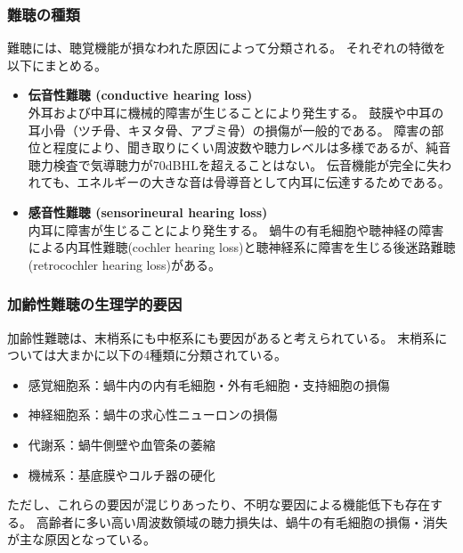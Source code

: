 \subsubsection{難聴の種類}
難聴には、聴覚機能が損なわれた原因によって分類される。
それぞれの特徴を以下にまとめる。

\begin{itemize}
\item \textbf{伝音性難聴 (conductive hearing loss)}\\
 外耳および中耳に機械的障害が生じることにより発生する。
 鼓膜や中耳の耳小骨（ツチ骨、キヌタ骨、アブミ骨）の損傷が一般的である。
 障害の部位と程度により、聞き取りにくい周波数や聴力レベルは多様であるが、純音聴力検査で気導聴力が70dBHLを超えることはない。
 伝音機能が完全に失われても、エネルギーの大きな音は骨導音として内耳に伝達するためである。
\item \textbf{感音性難聴 (sensorineural hearing loss)}\\
 内耳に障害が生じることにより発生する。
 蝸牛の有毛細胞や聴神経の障害による内耳性難聴(cochler hearing loss)と聴神経系に障害を生じる後迷路難聴(retrocochler hearing loss)がある。
\end{itemize}


\subsubsection{加齢性難聴の生理学的要因}
加齢性難聴は、末梢系にも中枢系にも要因があると考えられている。
末梢系については大まかに以下の4種類に分類されている\cite{Schuknecht1993presbycusis}。
\begin{itemize}
\item 感覚細胞系：蝸牛内の内有毛細胞・外有毛細胞・支持細胞の損傷
\item 神経細胞系：蝸牛の求心性ニューロンの損傷
\item 代謝系：蝸牛側壁や血管条の萎縮
\item 機械系：基底膜やコルチ器の硬化
\end{itemize}
ただし、これらの要因が混じりあったり、不明な要因による機能低下も存在する。
高齢者に多い高い周波数領域の聴力損失は、蝸牛の有毛細胞の損傷・消失が主な原因となっている。



